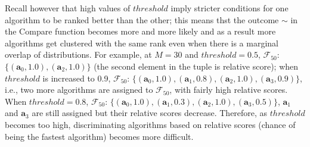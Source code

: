 \documentclass[conference]{IEEEtran}
\begin{document}
Recall however that high values of $threshold$ imply stricter conditions for one algorithm to be ranked better than the
other; this means thst the outcome $\sim$ in the Compare function becomes more and more likely and as a result more
algorithms get clustered with the same rank even when there is a marginal overlap of distributions. For example, at
$M=30$ and $threshold=0.5$,  $\mathcal{F}_{50}$: $\{(\mathbf{a}_0,1.0),(\mathbf{a}_2,1.0)\}$ (the second element in the
tuple is relative score); when $threshold$ is increased to 0.9, $\mathcal{F}_{50}$:
$\{(\mathbf{a}_0,1.0),(\mathbf{a}_1,0.8), (\mathbf{a}_2,1.0), (\mathbf{a}_3,0.9)\}$, i.e., two more  algorithms are assigned to $\mathcal{F}_{50}$, with fairly high relative scores. When $threshold = 0.8$, $\mathcal{F}_{50}$: $\{(\mathbf{a}_0,1.0),(\mathbf{a}_1,0.3), (\mathbf{a}_2,1.0), (\mathbf{a}_3,0.5)\}$, $\mathbf{a}_1$ and $\mathbf{a}_3$ are still assigned but their relative scores decrease. Therefore, as $threshold$ becomes too high, discriminating algorithms based on relative scores (chance of being the fastest algorithm) becomes more difficult.
 
\end{document}
